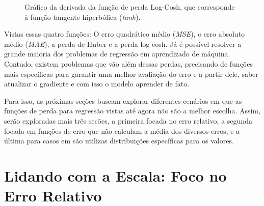 \begin{figure}[h!]
    \centering
    \caption{Gráfico da derivada da função de perda Log-Cosh, que corresponde à função tangente hiperbólica (\textit{tanh}).}
    \label{fig:log-cosh-derivada}
\end{figure}

Vistas essas quatro funções: O erro quadrático médio (\textit{MSE}), o erro absoluto médio (\textit{MAE}), a perda de Huber e a perda log-cosh. Já é possível resolver a grande maioria dos problemas de regressão em aprendizado de máquina. Contudo, existem problemas que vão além dessas perdas, precisando de funções mais específicas para garantir uma melhor avaliação do erro e a partir dele, saber atualizar o gradiente e com isso o modelo aprender de fato.

Para isso, as próximas seções buscam explorar diferentes cenários em que as funções de perda para regressão vistas até agora não são a melhor escolha. Assim, serão exploradas mais três secões, a primeira focada no erro relativo, a segunda focada em funções de erro que não calculam a média dos diversos erros, e a última para casos em são utilizas distribuições específicas para os valores.

\section{Lidando com a Escala: Foco no Erro Relativo}

